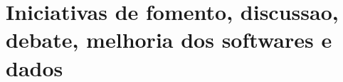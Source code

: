 %
%
%
%
%
%
%

\section{Iniciativas de fomento, discussao, debate, melhoria dos softwares e dados}



